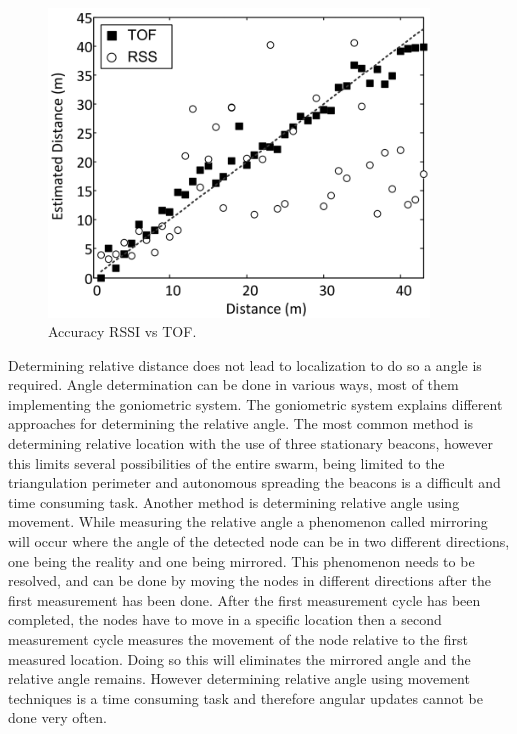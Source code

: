 \documentclass[10pt,a4paper]{article}
\begin{document}
\begin{figure}[H]
\centering
\includegraphics[width=0.9\textwidth]{RSSIvsTOF.pdf}
\caption{Accuracy RSSI vs TOF.\cite{TOF}} 
\label{RSSIvsTOF}
\end{figure}

Determining relative distance does not lead to localization to do so a angle is required. Angle determination can be done in various ways, most of them implementing the goniometric system. The goniometric system explains different approaches for determining the relative angle. The most common method is determining relative location with the use of three stationary beacons, however this limits several possibilities of the entire swarm, being limited to the triangulation perimeter and autonomous spreading the beacons is a difficult and time consuming task.
Another method is determining relative angle using movement. While measuring the relative angle a phenomenon called mirroring will occur where the angle of the detected node can be in two different directions, one being the reality and one being mirrored. This phenomenon needs to be resolved, and can be done by moving the nodes in different directions after the first measurement has been done. After the first measurement cycle has been completed, the nodes have to move in a specific location then a second measurement cycle measures the movement of the node relative to the first measured location. Doing so this will eliminates the mirrored angle and the relative angle remains. However determining relative angle using movement techniques is a time consuming task and therefore angular updates cannot be done very often.
\end{document}
